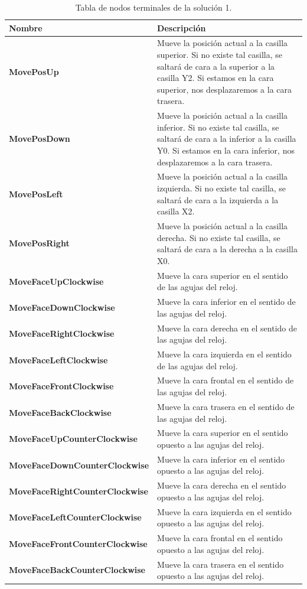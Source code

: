 \begin{table}[t]
\caption{Tabla de nodos terminales de la solución 1.}
\label{tab:n-terminales-sol1}
\centering
\begin{tabular}{lp{8cm}}
\toprule
\textbf{Nombre} & \textbf{Descripción}\\
\midrule
\textbf{MovePosUp}					&	Mueve la posición actual a la casilla superior. Si no
existe tal casilla, se saltará de cara a la superior a la casilla Y2. Si
estamos en la cara superior, nos desplazaremos a la cara trasera.\\ \hline
\textbf{MovePosDown}				&	Mueve la
posición actual a la casilla inferior. Si no existe tal casilla, se saltará de
cara a la inferior a la casilla Y0. Si estamos en la cara inferior, nos
desplazaremos a la cara trasera.\\\hline
\textbf{MovePosLeft}				&	Mueve la posición actual a la casilla izquierda. Si
no existe tal casilla, se saltará de cara a la izquierda a la casilla
X2.\\\hline \textbf{MovePosRight}				&	Mueve la posición actual a la casilla derecha. Si no
existe tal casilla, se saltará de cara a la derecha a la casilla X0. \\\hline
\textbf{MoveFaceUpClockwise}			&	Mueve la cara superior en el sentido de las
agujas del reloj.\\\hline
\textbf{MoveFaceDownClockwise}		&	Mueve la cara inferior en el sentido de las
agujas del reloj.\\\hline
\textbf{MoveFaceRightClockwise}		&	Mueve la cara derecha en el sentido
de las agujas del reloj.\\\hline
\textbf{MoveFaceLeftClockwise}		&	Mueve la cara izquierda en
el sentido de las agujas del reloj.\\\hline
\textbf{MoveFaceFrontClockwise}		&	Mueve la cara
frontal en el sentido de las agujas del reloj. \\\hline
\textbf{MoveFaceBackClockwise}		&	Mueve la cara trasera en el sentido de las
agujas del reloj.\\\hline
\textbf{MoveFaceUpCounterClockwise}&	Mueve la cara superior en el sentido
opuesto a las agujas del reloj.\\\hline
\textbf{MoveFaceDownCounterClockwise}&	Mueve la cara inferior en
el sentido opuesto a las agujas del reloj.\\\hline
\textbf{MoveFaceRightCounterClockwise}&	Mueve
la cara derecha en el sentido opuesto a las agujas del reloj.\\\hline
\textbf{MoveFaceLeftCounterClockwise}&	Mueve la cara izquierda en el sentido
opuesto a las agujas del reloj.\\\hline
 \textbf{MoveFaceFrontCounterClockwise}&	Mueve la cara frontal en
el sentido opuesto a las agujas del reloj.\\\hline
 \textbf{MoveFaceBackCounterClockwise}&Mueve
la cara trasera en el sentido opuesto a las agujas del reloj.\\
\bottomrule
\end{tabular}
\end{table}


